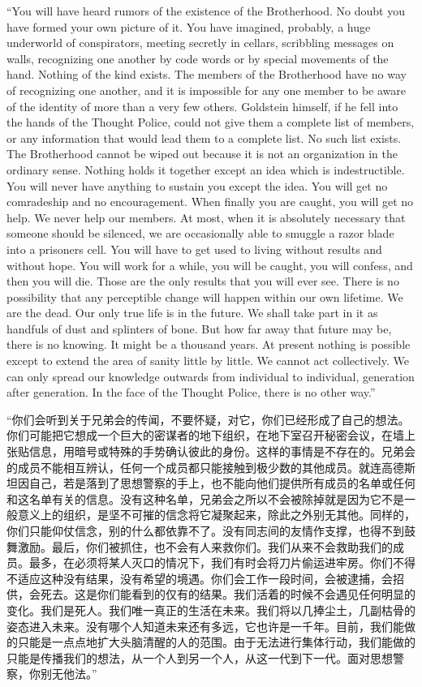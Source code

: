 \begin{paracol}{2}
\switchcolumn*

``You will have heard rumors of the existence of the Brotherhood. No
doubt you have formed your own picture of it. You have imagined,
probably, a huge underworld of conspirators, meeting secretly in
cellars, scribbling messages on walls, recognizing one another by code
words or by special movements of the hand. Nothing of the kind exists.
The members of the Brotherhood have no way of recognizing one another,
and it is impossible for any one member to be aware of the identity of
more than a very few others. Goldstein himself, if he fell into the
hands of the Thought Police, could not give them a complete list of
members, or any information that would lead them to a complete list. No
such list exists. The Brotherhood cannot be wiped out because it is not
an organization in the ordinary sense. Nothing holds it together except
an idea which is indestructible. You will never have anything to sustain
you except the idea. You will get no comradeship and no encouragement.
When finally you are caught, you will get no help. We never help our
members. At most, when it is absolutely necessary that someone should be
silenced, we are occasionally able to smuggle a razor blade into a
prisoner\textquotesingle s cell. You will have to get used to living
without results and without hope. You will work for a while, you will be
caught, you will confess, and then you will die. Those are the only
results that you will ever see. There is no possibility that any
perceptible change will happen within our own lifetime. We are the dead.
Our only true life is in the future. We shall take part in it as
handfuls of dust and splinters of bone. But how far away that future may
be, there is no knowing. It might be a thousand years. At present
nothing is possible except to extend the area of sanity little by
little. We cannot act collectively. We can only spread our knowledge
outwards from individual to individual, generation after generation. In
the face of the Thought Police, there is no other way.''

\switchcolumn

``你们会听到关于兄弟会的传闻，不要怀疑，对它，你们已经形成了自己的想法。你们可能把它想成一个巨大的密谋者的地下组织，在地下室召开秘密会议，在墙上张贴信息，用暗号或特殊的手势确认彼此的身份。这样的事情是不存在的。兄弟会的成员不能相互辨认，任何一个成员都只能接触到极少数的其他成员。就连高德斯坦因自己，若是落到了思想警察的手上，也不能向他们提供所有成员的名单或任何和这名单有关的信息。没有这种名单，兄弟会之所以不会被除掉就是因为它不是一般意义上的组织，是坚不可摧的信念将它凝聚起来，除此之外别无其他。同样的，你们只能仰仗信念，别的什么都依靠不了。没有同志间的友情作支撑，也得不到鼓舞激励。最后，你们被抓住，也不会有人来救你们。我们从来不会救助我们的成员。最多，在必须将某人灭口的情况下，我们有时会将刀片偷运进牢房。你们不得不适应这种没有结果，没有希望的境遇。你们会工作一段时间，会被逮捕，会招供，会死去。这是你们能看到的仅有的结果。我们活着的时候不会遇见任何明显的变化。我们是死人。我们唯一真正的生活在未来。我们将以几捧尘土，几副枯骨的姿态进入未来。没有哪个人知道未来还有多远，它也许是一千年。目前，我们能做的只能是一点点地扩大头脑清醒的人的范围。由于无法进行集体行动，我们能做的只能是传播我们的想法，从一个人到另一个人，从这一代到下一代。面对思想警察，你别无他法。''


\end{paracol}
